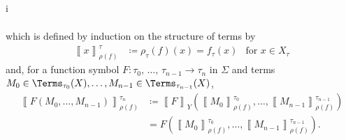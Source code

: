 \begin{partsolution}{i}
\begin{description}
\begin{align*}
\end{align*}
which is defined by induction on the structure of terms by
\begin{align*}
\left\llbracket x \right\rrbracket_{\rho(f)}^\tau &\coloneq \rho_\tau(f)(x) = f_\tau(x) &\text{for \(x \in X_\tau\)}
\end{align*}
and, for a function symbol \(F : \tau_0,\,\ldots,\,\tau_{n-1} \to \tau_n\) in \(\Sigma\) and terms \(M_0 \in \Terms_{\tau_0}(X), \ldots, M_{n-1} \in \Terms_{\tau_{n-1}}(X)\),
\begin{align*}
\left\llbracket F(M_0,\ldots,M_{n-1}) \right\rrbracket_{\rho(f)}^{\tau_n}
&\coloneq \left\llbracket F \right\rrbracket_Y\left(\left\llbracket M_0 \right\rrbracket_{\rho(f)}^{\tau_0}, \ldots, \left\llbracket M_{n-1} \right\rrbracket_{\rho(f)}^{\tau_{n-1}}\right) \\
&= F \left(\left\llbracket M_0 \right\rrbracket_{\rho(f)}^{\tau_0}, \ldots, \left\llbracket M_{n-1} \right\rrbracket_{\rho(f)}^{\tau_{n-1}}\right).
\end{align*}
\end{description}
\end{partsolution}
